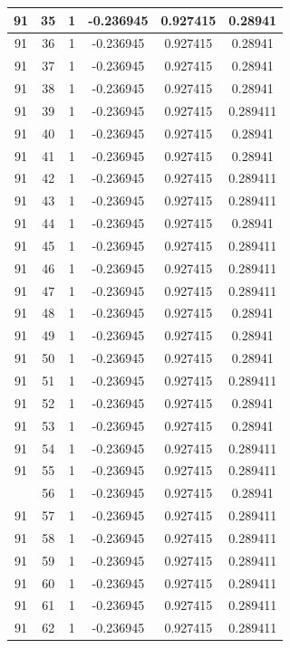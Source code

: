 \documentclass[12pt,a4paper]{article}
\numberwithin{equation}{section}
\numberwithin{figure}{section}
\numberwithin{table}{section}
\begin{document}
\begin{longtable}{|c|c|c|c|c|c|}
91 & 35 & 1 & -0.236945 & 0.927415 & 0.28941 \\ \hline
91 & 36 & 1 & -0.236945 & 0.927415 & 0.28941 \\ \hline
91 & 37 & 1 & -0.236945 & 0.927415 & 0.28941 \\ \hline
91 & 38 & 1 & -0.236945 & 0.927415 & 0.28941 \\ \hline
91 & 39 & 1 & -0.236945 & 0.927415 & 0.289411 \\ \hline
91 & 40 & 1 & -0.236945 & 0.927415 & 0.28941 \\ \hline
91 & 41 & 1 & -0.236945 & 0.927415 & 0.28941 \\ \hline
91 & 42 & 1 & -0.236945 & 0.927415 & 0.289411 \\ \hline
91 & 43 & 1 & -0.236945 & 0.927415 & 0.289411 \\ \hline
91 & 44 & 1 & -0.236945 & 0.927415 & 0.28941 \\ \hline
91 & 45 & 1 & -0.236945 & 0.927415 & 0.289411 \\ \hline
91 & 46 & 1 & -0.236945 & 0.927415 & 0.289411 \\ \hline
91 & 47 & 1 & -0.236945 & 0.927415 & 0.289411 \\ \hline
91 & 48 & 1 & -0.236945 & 0.927415 & 0.28941 \\ \hline
91 & 49 & 1 & -0.236945 & 0.927415 & 0.28941 \\ \hline
91 & 50 & 1 & -0.236945 & 0.927415 & 0.28941 \\ \hline
91 & 51 & 1 & -0.236945 & 0.927415 & 0.289411 \\ \hline
91 & 52 & 1 & -0.236945 & 0.927415 & 0.28941 \\ \hline
91 & 53 & 1 & -0.236945 & 0.927415 & 0.28941 \\ \hline
91 & 54 & 1 & -0.236945 & 0.927415 & 0.289411 \\ \hline
91 & 55 & 1 & -0.236945 & 0.927415 & 0.289411 \\ \hline
\pagebreak
91 & 56 & 1 & -0.236945 & 0.927415 & 0.28941 \\ \hline
91 & 57 & 1 & -0.236945 & 0.927415 & 0.289411 \\ \hline
91 & 58 & 1 & -0.236945 & 0.927415 & 0.289411 \\ \hline
91 & 59 & 1 & -0.236945 & 0.927415 & 0.289411 \\ \hline
91 & 60 & 1 & -0.236945 & 0.927415 & 0.289411 \\ \hline
91 & 61 & 1 & -0.236945 & 0.927415 & 0.289411 \\ \hline
91 & 62 & 1 & -0.236945 & 0.927415 & 0.289411 \\ \hline

\end{longtable}
\end{document}
